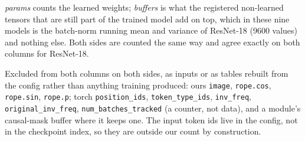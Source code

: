 \begin{minipage}{\linewidth}\footnotesize
\par\smallskip
\emph{params} counts the learned weights; \emph{buffers} is what the registered non-learned tensors that are still part of the trained model add on top, which in these nine models is the batch-norm running mean and variance of ResNet-18 (9600 values) and nothing else. Both sides are counted the same way and agree exactly on both columns for ResNet-18.
\par\smallskip
Excluded from both columns on both sides, as inputs or as tables rebuilt from the config rather than anything training produced: ours \texttt{image}, \texttt{rope.cos}, \texttt{rope.sin}, \texttt{rope.p}; torch \texttt{position\_ids}, \texttt{token\_type\_ids}, \texttt{inv\_freq}, \texttt{original\_inv\_freq}, \texttt{num\_batches\_tracked} (a counter, not data), and a module's causal-mask buffer where it keeps one. The input token ids live in the config, not in the checkpoint index, so they are outside our count by construction.
\end{minipage}

